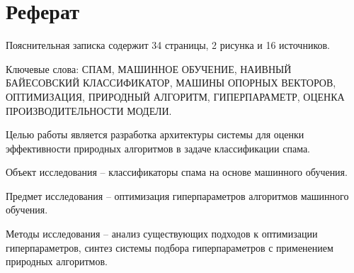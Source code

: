 \chapter*{Реферат}
\thispagestyle{plain}
Пояснительная записка содержит 34 страницы, 2 рисунка и 16 источников.

Ключевые слова: СПАМ, МАШИННОЕ ОБУЧЕНИЕ, НАИВНЫЙ 
БАЙЕСОВСКИЙ КЛАССИФИКАТОР, МАШИНЫ ОПОРНЫХ ВЕКТОРОВ, ОПТИМИЗАЦИЯ, 
ПРИРОДНЫЙ АЛГОРИТМ, ГИПЕРПАРАМЕТР, ОЦЕНКА ПРОИЗВОДИТЕЛЬНОСТИ МОДЕЛИ.

Целью работы является разработка архитектуры системы для оценки эффективности 
природных алгоритмов в задаче классификации спама. 

Объект исследования -- классификаторы спама на основе машинного обучения. 

Предмет исследования -- оптимизация гиперпараметров алгоритмов машинного обучения.

Методы исследования -- анализ существующих подходов к оптимизации гиперпараметров, 
синтез системы подбора гиперпараметров с применением природных алгоритмов.
 